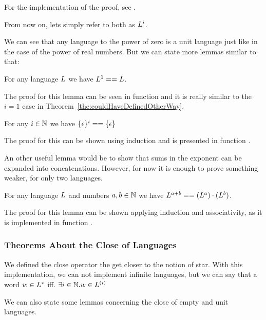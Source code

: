 For the implementation of the proof, see .

From now on, lets simply refer to both as $L^i$.

We can see that any language to the power of zero is a unit language just like in the case of the power of real numbers. But we can state more lemmas similar to that:

\begin{lemma}
	\label{lem:langToFirst}
	For any language $L$ we have $L^1 == L$.
\end{lemma}

The proof for this lemma can be seen in function  and it is really similar to the $i=1$ case in Theorem~\ref{the:couldHaveDefinedOtherWay}.

\begin{lemma}
	\label{lem:unitLangPow}
	For any $i \in \mathbb{N}$ we have $\{\epsilon\}^i == \{\epsilon\}$
\end{lemma}

The proof for this can be shown using induction and is presented in function .

An other useful lemma would be to show that sums in the exponent can be expanded into concatenations. However, for now it is enough to prove something weaker, for only two languages.

\begin{lemma}
	\label{lem:powSum}
	For any language $L$ and numbers $a,b \in \mathbb{N}$ we have $L ^ {a+b} == (L ^ a) \cdot (L ^ b)$.
\end{lemma}

The proof for this lemma can be shown applying induction and associativity, as it is implemented in function .

\subsubsection{Theorems About the Close of Languages}

We defined the close operator the get closer to the notion of star. With this implementation, we can not implement infinite languages, but we can say that a word $w \in L^{*}$ iff. $\exists i \in \mathbb{N}. w \in L^{(i)}$ 

We can also state some lemmas concerning the close of empty and unit languages.

